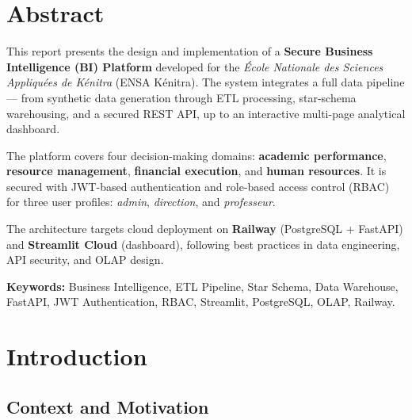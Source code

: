 \documentclass[12pt, a4paper]{report}
\begin{document}
\chapter*{Abstract}
\begin{mdframed}[linecolor=ENSABlue, linewidth=1.5pt, leftmargin=0, rightmargin=0, innerleftmargin=12pt, innerrightmargin=12pt, innertopmargin=12pt, innerbottommargin=12pt]
This report presents the design and implementation of a \textbf{Secure Business Intelligence (BI) Platform} developed for the \textit{École Nationale des Sciences Appliquées de Kénitra} (ENSA Kénitra). The system integrates a full data pipeline — from synthetic data generation through ETL processing, star-schema warehousing, and a secured REST API, up to an interactive multi-page analytical dashboard.

The platform covers four decision-making domains: \textbf{academic performance}, \textbf{resource management}, \textbf{financial execution}, and \textbf{human resources}. It is secured with JWT-based authentication and role-based access control (RBAC) for three user profiles: \textit{admin}, \textit{direction}, and \textit{professeur}.

The architecture targets cloud deployment on \textbf{Railway} (PostgreSQL + FastAPI) and \textbf{Streamlit Cloud} (dashboard), following best practices in data engineering, API security, and OLAP design.
\end{mdframed}

\vspace{1cm}
\noindent\textbf{Keywords:} Business Intelligence, ETL Pipeline, Star Schema, Data Warehouse, FastAPI, JWT Authentication, RBAC, Streamlit, PostgreSQL, OLAP, Railway.

\tableofcontents
\listoffigures
\listoftables

\chapter{Introduction}

\section{Context and Motivation}
\end{document}
